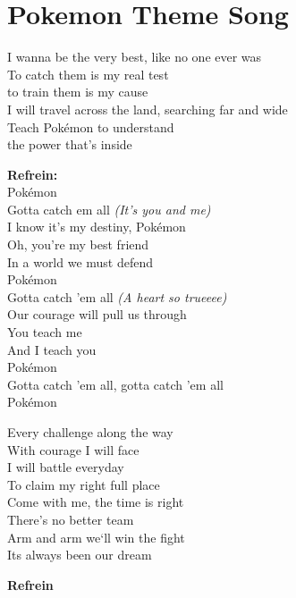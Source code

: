 \section{Pokemon Theme Song}

I wanna be the very best, like no one ever was\\
To catch them is my real test\\
to train them is my cause\\
I will travel across the land, searching far and wide\\
Teach Pokémon to understand\\
the power that's inside 

\textbf{Refrein:}\\
Pokémon\\
Gotta catch em all \textit{(It's you and me)}\\
I know it's my destiny, Pokémon\\
Oh, you're my best friend\\
In a world we must defend\\
Pokémon\\
Gotta catch 'em all \textit{(A heart so trueeee)}\\
Our courage will pull us through\\
You teach me\\
And I teach you\\
Pokémon\\
Gotta catch 'em all, gotta catch 'em all\\
Pokémon

Every challenge along the way\\
With courage I will face\\
I will battle everyday\\
To claim my right full place\\
Come with me, the time is right\\
There's no better team\\
Arm and arm we`ll win the fight\\
Its always been our dream

\textbf{Refrein}
